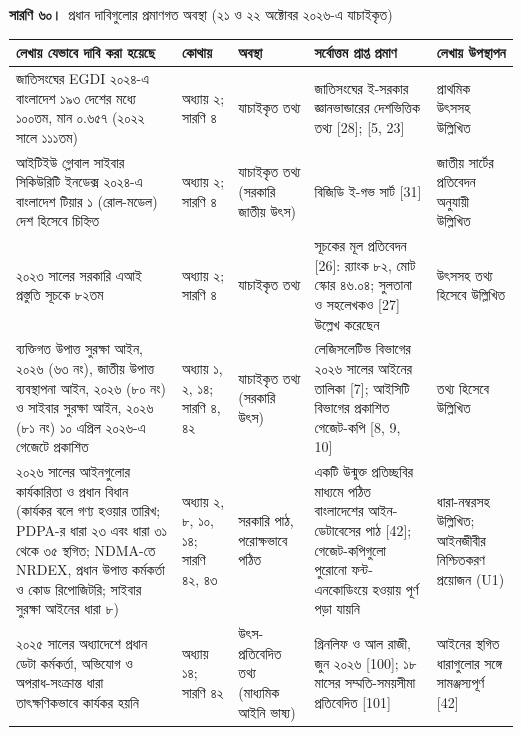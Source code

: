 \documentclass[border=10pt]{standalone}
\begin{document}
\begin{minipage}{17cm}
{\large\bfseries সারণি ৬০।}\ {\large প্রধান দাবিগুলোর প্রমাণগত অবস্থা (২১ ও ২২ অক্টোবর ২০২৬-এ যাচাইকৃত)}\par\vspace{7pt}
\small
{}
\begin{tabularx}{\linewidth}{@{}>{\hsize=1.275\hsize\raggedright\arraybackslash}X>{\hsize=0.637\hsize\raggedright\arraybackslash}X>{\hsize=0.735\hsize\raggedright\arraybackslash}X>{\hsize=1.275\hsize\raggedright\arraybackslash}X>{\hsize=1.078\hsize\raggedright\arraybackslash}X@{}}
\arrayrulecolor{bapilrule}\toprule
\rowcolor{white}\textbf{লেখায় যেভাবে দাবি করা হয়েছে} & \textbf{কোথায়} & \textbf{অবস্থা} & \textbf{সর্বোত্তম প্রাপ্ত প্রমাণ} & \textbf{লেখায় উপস্থাপন} \\
\midrule
জাতিসংঘের EGDI ২০২৪-এ বাংলাদেশ ১৯৩ দেশের মধ্যে ১০০তম, মান ০.৬৫৭ (২০২২ সালে ১১১তম) & অধ্যায় ২; সারণি ৪ & যাচাইকৃত তথ্য & জাতিসংঘের ই-সরকার জ্ঞানভান্ডারের দেশভিত্তিক তথ্য [28]; [5, 23] & প্রাথমিক উৎসসহ উল্লিখিত \\
আইটিইউ গ্লোবাল সাইবার সিকিউরিটি ইনডেক্স ২০২৪-এ বাংলাদেশ টিয়ার ১ (রোল-মডেল) দেশ হিসেবে চিহ্নিত & অধ্যায় ২; সারণি ৪ & যাচাইকৃত তথ্য (সরকারি জাতীয় উৎস) & বিজিডি ই-গভ সার্ট [31] & জাতীয় সার্টের প্রতিবেদন অনুযায়ী উল্লিখিত \\
২০২৩ সালের সরকারি এআই প্রস্তুতি সূচকে ৮২তম & অধ্যায় ২; সারণি ৪ & যাচাইকৃত তথ্য & সূচকের মূল প্রতিবেদন [26]: র‍্যাংক ৮২, মোট স্কোর ৪৬.০৪; সুলতানা ও সহলেখকও [27] উল্লেখ করেছেন & উৎসসহ তথ্য হিসেবে উল্লিখিত \\
ব্যক্তিগত উপাত্ত সুরক্ষা আইন, ২০২৬ (৬৩ নং), জাতীয় উপাত্ত ব্যবস্থাপনা আইন, ২০২৬ (৮০ নং) ও সাইবার সুরক্ষা আইন, ২০২৬ (৮১ নং) ১০ এপ্রিল ২০২৬-এ গেজেটে প্রকাশিত & অধ্যায় ১, ২, ১৪; সারণি ৪, ৪২ & যাচাইকৃত তথ্য (সরকারি উৎস) & লেজিসলেটিভ বিভাগের ২০২৬ সালের আইনের তালিকা [7]; আইসিটি বিভাগের প্রকাশিত গেজেট-কপি [8, 9, 10] & তথ্য হিসেবে উল্লিখিত \\
২০২৬ সালের আইনগুলোর কার্যকারিতা ও প্রধান বিধান (কার্যকর বলে গণ্য হওয়ার তারিখ; PDPA-র ধারা ২৩ এবং ধারা ৩১ থেকে ৩৫ স্থগিত; NDMA-তে NRDEX, প্রধান উপাত্ত কর্মকর্তা ও কোড রিপোজিটরি; সাইবার সুরক্ষা আইনের ধারা ৮) & অধ্যায় ২, ৮, ১০, ১৪; সারণি ৪২, ৪৩ & সরকারি পাঠ, পরোক্ষভাবে পঠিত & একটি উন্মুক্ত প্রতিচ্ছবির মাধ্যমে পঠিত বাংলাদেশের আইন-ডেটাবেসের পাঠ [42]; গেজেট-কপিগুলো পুরোনো ফন্ট-এনকোডিংয়ে হওয়ায় পূর্ণ পড়া যায়নি & ধারা-নম্বরসহ উল্লিখিত; আইনজীবীর নিশ্চিতকরণ প্রয়োজন (U1) \\
২০২৫ সালের অধ্যাদেশে প্রধান ডেটা কর্মকর্তা, অভিযোগ ও অপরাধ-সংক্রান্ত ধারা তাৎক্ষণিকভাবে কার্যকর হয়নি & অধ্যায় ১৪; সারণি ৪২ & উৎস-প্রতিবেদিত তথ্য (মাধ্যমিক আইনি ভাষ্য) & গ্রিনলিফ ও আল রাজী, জুন ২০২৬ [100]; ১৮ মাসের সম্মতি-সময়সীমা প্রতিবেদিত [101] & আইনের স্থগিত ধারাগুলোর সঙ্গে সামঞ্জস্যপূর্ণ [42] \\

\end{tabularx}
\end{minipage}
\end{document}
